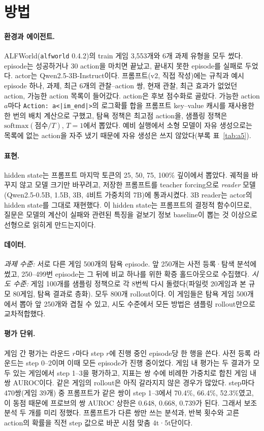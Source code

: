 \documentclass[10pt]{article}
\newcommand{\code}[1]{\texttt{#1}}
\begin{document}
\section{방법}
\paragraph{환경과 에이전트.} ALFWorld(\code{alfworld} 0.4.2)의 train 게임 3,553개와 6개 과제 유형을 모두 썼다. episode는 성공하거나 30 action을 마치면 끝났고, 끝내지 못한 episode를 실패로 두었다.
actor는 Qwen2.5-3B-Instruct이다. 프롬프트(v2, 직접 작성)에는 규칙과 예시 episode 하나, 과제, 최근 6개의 관찰--action 쌍, 현재 관찰, 최근 효과가 없었던 action, 가능한 action 목록이 들어갔다.
action은 후보 점수화로 골랐다. 가능한 action $a$마다 \code{Action: a<|im\_end|>}의 로그확률 합을 프롬프트 key--value 캐시를 재사용한 한 번의 배치 계산으로 구했고, 탐욕 정책은 최고점 action을, 샘플링 정책은 $\mathrm{softmax}(\text{점수}/T)$, $T=1$에서 뽑았다.
예비 실행에서 소형 모델이 자유 생성으로는 목록에 없는 action을 자주 냈기 때문에 자유 생성은 쓰지 않았다(부록 표~\ref{tab:a5}).

\paragraph{표현.} hidden state는 프롬프트 마지막 토큰의 25, 50, 75, 100\% 깊이에서 뽑았다. 궤적을 바꾸지 않고 모델 크기만 바꾸려고, 저장한 프롬프트를 teacher forcing으로 \emph{reader} 모델(Qwen2.5-0.5B, 1.5B, 3B, 4비트 가중치의 7B)에 통과시켰다. 3B reader는 actor의 hidden state를 그대로 재현했다. 이 hidden state는 프롬프트의 결정적 함수이므로, 질문은 모델의 계산이 실패와 관련된 특징을 겉보기 정보 baseline이 뽑는 것 이상으로 선형으로 읽히게 만드는지이다.

\paragraph{데이터.} \emph{과제 수준:} 서로 다른 게임 500개의 탐욕 episode. 앞 250개는 사전 등록·탐색 분석에 썼고, 250--499번 episode는 그 뒤에 비교 하나를 위한 확증 홀드아웃으로 수집했다.
\emph{시도 수준:} 게임 100개를 샘플링 정책으로 각 8번씩 다시 돌렸다(파일럿 20게임과 본 규모 80게임, 탐욕 결과로 층화). 모두 800개 rollout이다. 이 게임들은 탐욕 게임 500개에서 뽑아 앞 250개와 겹칠 수 있고, 시도 수준에서 모든 방법은 샘플링 rollout만으로 교차적합했다.

\paragraph{평가 단위.} 게임 간 평가는 라운드 $r$마다 step $r$에 진행 중인 episode당 한 행을 쓴다. 사전 등록 라운드는 step 0--2이며 이때 모든 episode가 진행 중이었다. 게임 내 평가는 두 결과가 모두 있는 게임에서 step 1--3을 평가하고, 지표는 쌍 수에 비례한 가중치로 합친 게임 내 쌍 AUROC이다.
같은 게임의 rollout은 아직 갈라지지 않은 경우가 많았다. step마다 470쌍(게임 39개) 중 프롬프트가 같은 쌍이 step 1--3에서 70.4\%, 66.4\%, 52.3\%였고, 이 동점 때문에 프로브의 쌍 AUROC 상한은 0.648, 0.668, 0.739가 된다.
그래서 보조 분석 두 개를 미리 정했다. 프롬프트가 다른 쌍만 쓰는 분석과, 반복 횟수와 고른 action의 확률을 직전 step 값으로 바꾼 시점 맞춤 4t·5t단이다.
\end{document}
